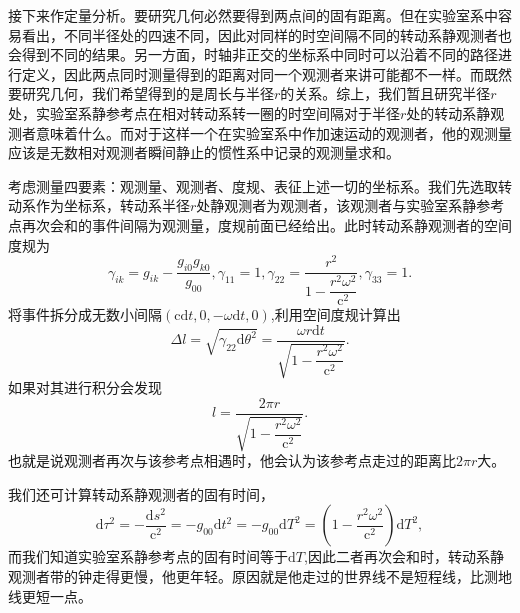 \documentclass[11pt, a4paper, oneside, onecolumn]{ctexart}
\numberwithin{equation}{subsection}
\begin{document}
接下来作定量分析。要研究几何必然要得到两点间的固有距离。但在实验室系中容易看出，不同半径处的四速不同，因此对同样的时空间隔不同的转动系静观测者也会得到不同的结果。另一方面，时轴非正交的坐标系中同时可以沿着不同的路径进行定义，因此两点同时测量得到的距离对同一个观测者来讲可能都不一样。而既然要研究几何，我们希望得到的是周长与半径$r$的关系。综上，我们暂且研究半径$r$处，实验室系静参考点在相对转动系转一圈的时空间隔对于半径$r$处的转动系静观测者意味着什么。而对于这样一个在实验室系中作加速运动的观测者，他的观测量应该是无数相对观测者瞬间静止的惯性系中记录的观测量求和。

考虑测量四要素：观测量、观测者、度规、表征上述一切的坐标系。我们先选取转动系作为坐标系，转动系半径$r$处静观测者为观测者，该观测者与实验室系静参考点再次会和的事件间隔为观测量，度规前面已经给出。此时转动系静观测者的空间度规为
\begin{equation}
\gamma_{ik}=g_{ik}-\frac{g_{i0}g_{k0}}{g_{00}},\gamma_{11}=1,\gamma_{22}=\frac{r^{2}}{1-\dfrac{r^{2}\omega^{2}}{\mathrm{c}^{2}}},\gamma_{33}=1.
\end{equation}
将事件拆分成无数小间隔$\left(\mathrm{c}\mathrm{d}t,0,-\omega\mathrm{d}t,0\right)$,利用空间度规计算出
\begin{equation}
\Delta{}l=\sqrt{\gamma_{22}\mathrm{d}\theta^{2}}=\frac{\omega r\mathrm{d}t}{\sqrt{1-\dfrac{r^{2}\omega^{2}}{\mathrm{c}^{2}}}}.
\end{equation}
如果对其进行积分会发现
\begin{equation}
l=\frac{2\pi r}{\sqrt{1-\dfrac{r^{2}\omega^{2}}{\mathrm{c}^{2}}}}.
\end{equation}
也就是说观测者再次与该参考点相遇时，他会认为该参考点走过的距离比$2\pi r$大。

我们还可计算转动系静观测者的固有时间，
\begin{equation}
\mathrm{d}\tau^{2}=-\frac{\mathrm{d}s^{2}}{\mathrm{c}^{2}}=-g_{00}\mathrm{d}t^{2}=-g_{00}\mathrm{d}T^{2}=\left(1-\frac{r^{2}\omega^{2}}{\mathrm{c}^{2}}\right)\mathrm{d}T^{2},
\end{equation}
而我们知道实验室系静参考点的固有时间等于$\mathrm{d}T$,因此二者再次会和时，转动系静观测者带的钟走得更慢，他更年轻。原因就是他走过的世界线不是短程线，比测地线更短一点。
\end{document}
